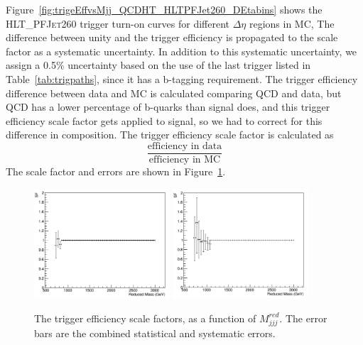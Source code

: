 Figure~\ref{fig:trigeEffvsMjj_QCDHT_HLTPFJet260_DEtabins} shows the \textsc{HLT\_PFJet260} trigger turn-on curves for different $\Delta\eta$ regions in MC, %
The difference between unity and the trigger efficiency is propagated to the scale factor as a systematic uncertainty. In addition to this systematic uncertainty, we assign a 0.5\% uncertainty based on the use of the last trigger listed in Table~\ref{tab:trigpaths}, since it has a b-tagging requirement. The trigger efficiency difference between data and MC is calculated comparing QCD and data, but QCD has a lower percentage of b-quarks than signal does, and this trigger efficiency scale factor gets applied to signal, so we had to correct for this difference in composition.
The trigger efficiency scale factor is calculated as
\begin{equation}
\frac{\text{efficiency in data}}{\text{efficiency in MC}}
\end{equation}
The scale factor and errors are shown in Figure~\ref{fig:trigSF}. 
\begin{figure}[h]
  \begin{center}  
    \includegraphics[width=0.45\textwidth]{F5/SFdEta0v2.pdf} 
    \includegraphics[width=0.45\textwidth]{F5/SFdEta1v2.pdf} 
  \end{center}
  \caption{The trigger efficiency scale factors, as a function of $M_{jjj}^{red}$. The error bars are the combined statistical and systematic errors.}
  \label{fig:trigSF}
  \end{figure} 

